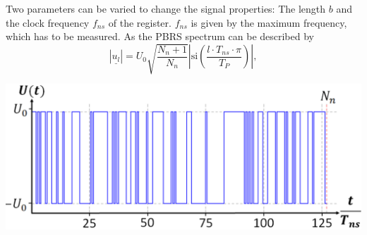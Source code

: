 \documentclass[paper=a0,accentcolor=tud9b,colorbacktitle,colorbacksubtitle]{tudposter}
\begin{document}
\begin{multicols}{2}
	 \begin{minipage}{0.195\textwidth}
	 Two parameters can be varied to change the signal properties: The length $\textstyle  b$ and the clock frequency $\textstyle f_{ns}$ of the register.
	 $\textstyle f_{ns}$ is given by the maximum frequency, which has to be measured. As the PBRS  spectrum can  be described by
	 	 \vspace{-0.5cm}
	 \begin{equation*}
	 \textstyle
	  |\underline{u_l}|=
	   U_0 \sqrt{\frac{N_n+1}{N_n}}\left| \textrm{si}\left(\frac{l\cdot T_{ns}\cdot \pi}{T_P} \right) \right|,
	 \end{equation*}
	\end{minipage}
	\begin{minipage}{0.01\textwidth}
	 \hspace{1cm}
	\end{minipage}
	\begin{minipage}{0.34\textwidth}
	 \begin{center}
	 \hspace{-4.5cm}
	  \includegraphics[scale=0.75]{PBRS_Signal3.eps}
	  \label{H_ESR}
	 \end{center}
	 \end{minipage}
	 

\end{multicols}
\end{document}
